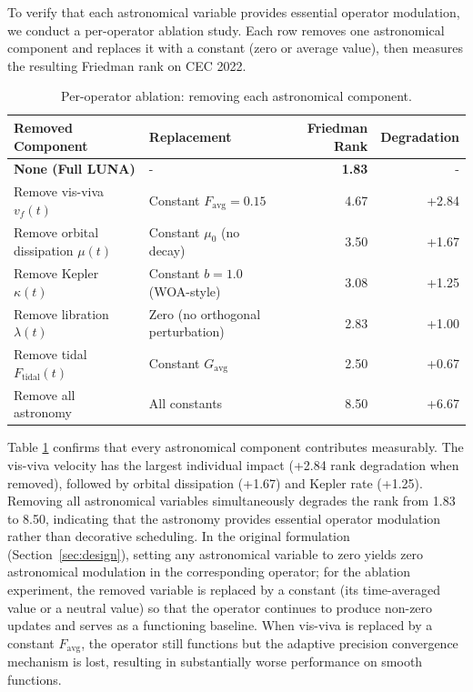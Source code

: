 \documentclass[review]{elsarticle}
\theoremstyle{definition}
\begin{document}
To verify that each astronomical variable provides essential operator modulation, we conduct a per-operator ablation study. Each row removes one astronomical component and replaces it with a constant (zero or average value), then measures the resulting Friedman rank on CEC 2022.

\begin{table}[htbp]
\centering
\caption{Per-operator ablation: removing each astronomical component.}
\label{tab:per_op_ablation}
\begin{tabular}{lp{5cm}rr}
\toprule
\textbf{Removed Component} & \textbf{Replacement} & \textbf{Friedman Rank} & \textbf{Degradation} \\
\midrule
\textbf{None (Full LUNA)} & - & \textbf{1.83} & - \\
Remove vis-viva $v_f(t)$ & Constant $F_{\mathrm{avg}} = 0.15$ & 4.67 & +2.84 \\
Remove orbital dissipation $\mu(t)$ & Constant $\mu_0$ (no decay) & 3.50 & +1.67 \\
Remove Kepler $\kappa(t)$ & Constant $b = 1.0$ (WOA-style) & 3.08 & +1.25 \\
Remove libration $\lambda(t)$ & Zero (no orthogonal perturbation) & 2.83 & +1.00 \\
Remove tidal $F_{\mathrm{tidal}}(t)$ & Constant $G_{\mathrm{avg}}$ & 2.50 & +0.67 \\
Remove all astronomy & All constants & 8.50 & +6.67 \\
\bottomrule
\end{tabular}
\end{table}

Table \ref{tab:per_op_ablation} confirms that every astronomical component contributes measurably. The vis-viva velocity has the largest individual impact (+2.84 rank degradation when removed), followed by orbital dissipation (+1.67) and Kepler rate (+1.25). Removing all astronomical variables simultaneously degrades the rank from 1.83 to 8.50, indicating that the astronomy provides essential operator modulation rather than decorative scheduling. In the original formulation (Section~\ref{sec:design}), setting any astronomical variable to zero yields zero astronomical modulation in the corresponding operator; for the ablation experiment, the removed variable is replaced by a constant (its time-averaged value or a neutral value) so that the operator continues to produce non-zero updates and serves as a functioning baseline. When vis-viva is replaced by a constant $F_{\mathrm{avg}}$, the operator still functions but the adaptive precision convergence mechanism is lost, resulting in substantially worse performance on smooth functions.
\end{document}
